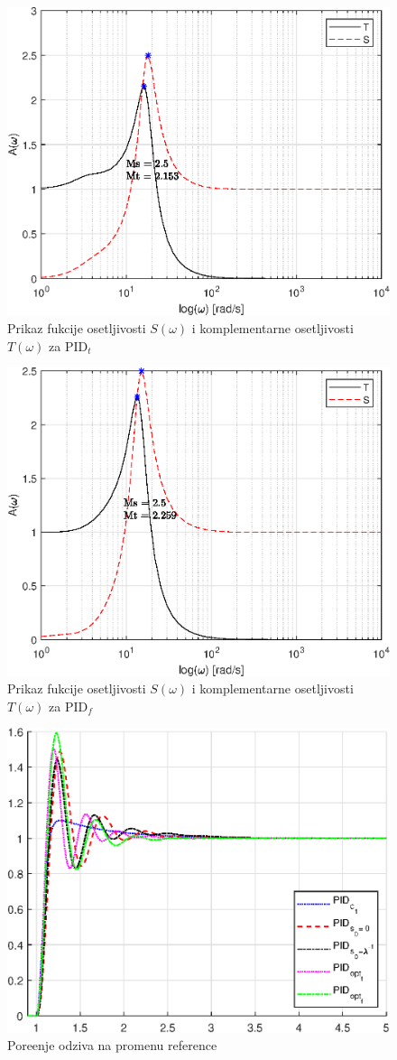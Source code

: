 \documentclass[a4paper,11pt]{article}
\theoremstyle{definition} \newtheorem{deff}{Definicija}[section]
\theoremstyle{definition} \newtheorem{prim}[deff]{Primer}
\theoremstyle{plain} \newtheorem{teor}[deff]{Teorema}
\begin{document}
	\begin{figure}[!h]
		\centering
		\includegraphics[width=0.6\linewidth]{slike/Ms_Mt_pid_opt.eps}
		\caption{Prikaz fukcije osetljivosti $S(\omega)$ i komplementarne osetljivosti $T(\omega)$ za PID$_{t}$}
		\label{fig:MsMt_pid_opt}
	\end{figure}
	
	\begin{figure}[!h]
		\centering
		\includegraphics[width=0.6\linewidth]{slike/Ms_Mt_pid_optf.eps}
		\caption{Prikaz fukcije osetljivosti $S(\omega)$ i komplementarne osetljivosti $T(\omega)$ za PID$_{f}$}
		\label{fig:MsMt_pid_optf}
	\end{figure}
	

	\clearpage
	
	\begin{figure}[!h]
		\centering
		\includegraphics[width=0.6\linewidth]{slike/Pg_comparison_default.eps}
		\caption{Pore\dj{}enje odziva na promenu reference}
		\label{fig:Pg_default}
	\end{figure}
	
\end{document}
